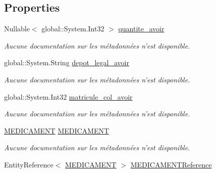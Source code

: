 \subsection*{Properties}
\begin{DoxyCompactItemize}
\item 
Nullable$<$ global\-::\-System.\-Int32 $>$ \hyperlink{class_model_1_1_a_v_o_i_r1_a254f425b0db72e17b64a10adabaa70b5}{quantite\-\_\-avoir}
\begin{DoxyCompactList}\small\item\em Aucune documentation sur les métadonnées n'est disponible. \end{DoxyCompactList}\item 
global\-::\-System.\-String \hyperlink{class_model_1_1_a_v_o_i_r1_adf026bb26b0d9dbeeb67174ac7e4e6f4}{depot\-\_\-legal\-\_\-avoir}
\begin{DoxyCompactList}\small\item\em Aucune documentation sur les métadonnées n'est disponible. \end{DoxyCompactList}\item 
global\-::\-System.\-Int32 \hyperlink{class_model_1_1_a_v_o_i_r1_a2a8193976f08870f00198f32d8ae2613}{matricule\-\_\-col\-\_\-avoir}
\begin{DoxyCompactList}\small\item\em Aucune documentation sur les métadonnées n'est disponible. \end{DoxyCompactList}\item 
\hyperlink{class_model_1_1_m_e_d_i_c_a_m_e_n_t}{M\-E\-D\-I\-C\-A\-M\-E\-N\-T} \hyperlink{class_model_1_1_a_v_o_i_r1_ab96497f0366be59e6527444f5ba21967}{M\-E\-D\-I\-C\-A\-M\-E\-N\-T}
\begin{DoxyCompactList}\small\item\em Aucune documentation sur les métadonnées n'est disponible. \end{DoxyCompactList}\item 
Entity\-Reference$<$ \hyperlink{class_model_1_1_m_e_d_i_c_a_m_e_n_t}{M\-E\-D\-I\-C\-A\-M\-E\-N\-T} $>$ \hyperlink{class_model_1_1_a_v_o_i_r1_a35632c4e829e1031b50c748726647cb1}{M\-E\-D\-I\-C\-A\-M\-E\-N\-T\-Reference}

\end{DoxyCompactItemize}
